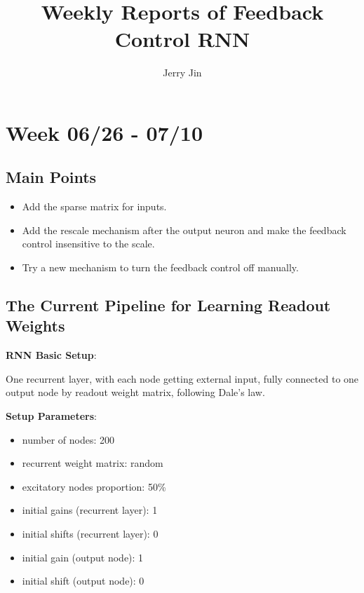 \documentclass[12pt, a4paper]{article}
\title{Weekly Reports of Feedback Control RNN}
\author{Jerry Jin}
\begin{document}
\maketitle

\section*{Week 06/26 - 07/10}

\subsection*{Main Points}

\noindent
\begin{itemize}
    \item Add the sparse matrix for inputs.
    \item Add the rescale mechanism after the output neuron and make the feedback control insensitive to the scale.
    \item Try a new mechanism to turn the feedback control off manually.
\end{itemize}

\newpage

\subsection*{The Current Pipeline for Learning Readout Weights}

\noindent
\textbf{RNN Basic Setup}:

One recurrent layer, with each node getting external input, fully connected to one output node by readout weight matrix, following Dale's law.

\vspace{10pt}

\noindent
\textbf{Setup Parameters}:

\begin{itemize}
    \item number of nodes: 200
    \item recurrent weight matrix: random
    \item excitatory nodes proportion: 50\%
    \item initial gains (recurrent layer): 1
    \item initial shifts (recurrent layer): 0
    \item initial gain (output node): 1
    \item initial shift (output node): 0
\end{itemize}
\end{document}
